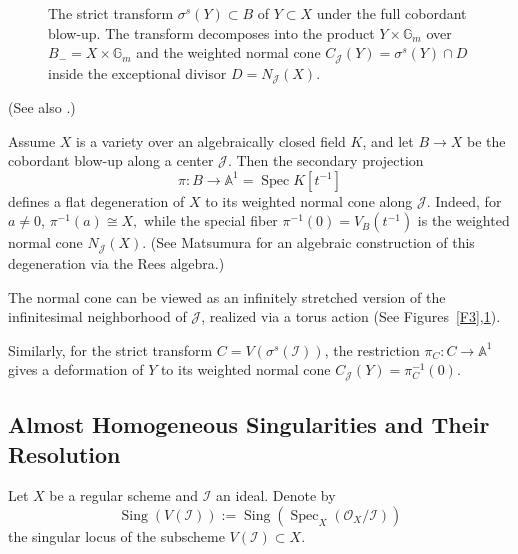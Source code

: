 \documentclass{amsart}
\newcommand{\cI}{{\mathcal I}}
\newcommand{\cJ}{{\mathcal J}}
\newcommand{\cO}{{\mathcal O}}
\newcommand{\Spec}{\operatorname{Spec}}
\newcommand{\Sing}{{\operatorname{Sing}}}
\begin{document}
\begin{figure}[ht]
\caption{The strict transform $\sigma^s(Y)\subset B$ of  $Y \subset X$ under the full cobordant blow-up. The transform decomposes into the product $Y \times \mathbb{G}_m$ over $B_- = X \times \mathbb{G}_m$ and the weighted normal cone $C_{\cJ}(Y) = \sigma^s(Y) \cap D$ inside the exceptional divisor $D = N_{\cJ}(X)$.}
\label{F4}
\end{figure}




\begin{remark}\label{deformation}
(See also \cite{Rydh-proj}.)

Assume \( X \) is a variety over an algebraically closed field \( K \), and let \( B \to X \) be the cobordant blow-up along a center \( \mathcal{J} \). Then the secondary projection
\[
\pi: B \to \mathbb{A}^1 = \Spec K[t^{-1}]
\]
defines a flat degeneration of \( X \) to its weighted normal cone along \( \mathcal{J} \). Indeed, for \( a \neq 0 \),
$
\pi^{-1}(a) \cong X,
$
while the special fiber
$
\pi^{-1}(0) = V_B(t^{-1})
$
is the weighted normal cone \( N_{\mathcal{J}}(X) \).
(See Matsumura \cite[Exercise 5, p.~176]{Mat} for an algebraic construction of this degeneration via the Rees algebra.)

The normal cone can be viewed as an infinitely stretched version of the infinitesimal neighborhood of \( \mathcal{J} \), realized via a torus action (See Figures~\ref{F3},\ref{F4}). 

Similarly, for the strict transform \( C = V(\sigma^s(\mathcal{I})) \), the restriction
$
\pi_C: C \to \mathbb{A}^1
$
gives a deformation of \( Y \) to its weighted normal cone
$
C_{\mathcal{J}}(Y) = \pi_C^{-1}(0) 
$.
\end{remark}
\subsection{Almost Homogeneous Singularities and Their Resolution} \label{almost}

Let $X$ be a regular scheme and $\cI$ an ideal. Denote by
\[
\Sing(V(\cI)) := \Sing(\Spec_X(\cO_X/\cI))
\]
the singular locus of the subscheme $V(\cI) \subset X$.
\end{document}
